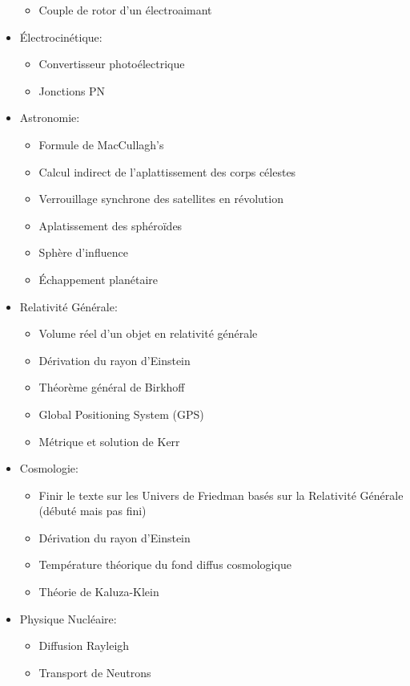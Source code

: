 \begin{itemize}
\begin{itemize}
				\item Couple de rotor d'un \'electroaimant
			\end{itemize}
		\item \'Electrocin\'etique:
			\begin{itemize}		
				\item Convertisseur photo\'electrique
				\item Jonctions PN
			\end{itemize}
		\item Astronomie:
			\begin{itemize}	
				\item Formule de MacCullagh's 
				\item Calcul indirect de l'aplattissement des corps c\'elestes
				\item Verrouillage synchrone des satellites en r\'evolution	
				\item Aplatissement des sph\'eroïdes
				\item Sphère d'influence
				\item \'Echappement plan\'etaire
			\end{itemize}		
		\item Relativit\'e G\'en\'erale:
			\begin{itemize}
				\item Volume r\'eel d'un objet en relativit\'e g\'en\'erale
				\item D\'erivation du rayon d'Einstein
				\item Th\'eorème g\'en\'eral de Birkhoff
				\item Global Positioning System (GPS)
				\item M\'etrique et solution de Kerr	
			\end{itemize}
		\item Cosmologie:
			\begin{itemize}
				\item Finir le texte sur les Univers de Friedman bas\'es sur la Relativit\'e G\'en\'erale (d\'ebut\'e mais pas fini)
				\item D\'erivation du rayon d'Einstein
				\item Temp\'erature th\'eorique du fond diffus cosmologique
				\item Th\'eorie de Kaluza-Klein
			\end{itemize}
		\item Physique Nucl\'eaire:
			\begin{itemize}
				\item Diffusion Rayleigh
				\item Transport de Neutrons

\end{itemize}
\end{itemize}
